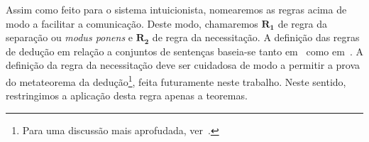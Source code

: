     Assim como feito para o sistema intuicionista, nomearemos as regras acima de modo a facilitar a comunicação.
    Deste modo, chamaremos $\mathbf{R_1}$ de regra da separação ou \emph{modus ponens} e $\mathbf{R_2}$ de regra da necessitação. A definição das regras de dedução em relação a conjuntos de sentenças baseia-se tanto em~\cite{Troelstra} como em~\cite{Hakli}. A definição da regra da necessitação deve ser cuidadosa de modo a permitir a prova do metateorema da dedução\footnote{Para uma discussão mais aprofudada, ver~\cite{Hakli}.}, feita futuramente neste trabalho. Neste sentido, restringimos a aplicação desta regra apenas a teoremas.

